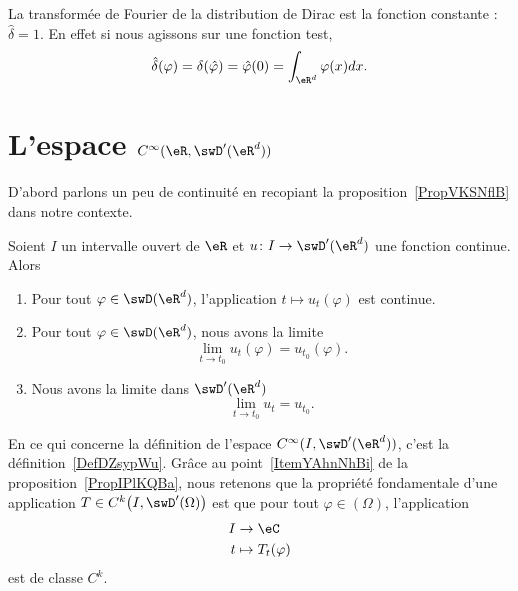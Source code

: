 \begin{example}
    La transformée de Fourier de la distribution de Dirac est la fonction constante : \( \hat \delta=1\). En effet si nous agissons sur une fonction test,
    \begin{equation}
        \hat \delta(\varphi)=\delta(\hat \varphi)=\hat \varphi(0)=\int_{\eR^d}\varphi(x)dx.
    \end{equation}
\end{example}

\section{L'espace \texorpdfstring{$  C^{\infty}(\eR,\swD'(\eR^d))$}{C(R,D')}}
\label{SecTEgDVWO}

D'abord parlons un peu de continuité en recopiant la proposition~\ref{PropVKSNflB} dans notre contexte.
\begin{proposition}     \label{PropIPlKQBa}
    Soient \( I\) un intervalle ouvert de \( \eR\) et \( u\colon I\to \swD'(\eR^d)\) une fonction continue. Alors
    \begin{enumerate}
        \item   \label{ItemYAhnNhBi}
            Pour tout \( \varphi\in\swD(\eR^d)\), l'application \( t\mapsto u_t(\varphi)\) est continue.
        \item
            Pour tout \( \varphi\in\swD(\eR^d)\), nous avons la limite
            \begin{equation}
                \lim_{t\to t_0} u_t(\varphi)=u_{t_0}(\varphi).
            \end{equation}
        \item
            Nous avons la limite dans \( \swD'(\eR^d)\)
            \begin{equation}
                \lim_{t\to t_0} u_t=u_{t_0}.
            \end{equation}
    \end{enumerate}
\end{proposition}
En ce qui concerne la définition de l'espace \( C^{\infty}(I,\swD'(\eR^d))\), c'est la définition~\ref{DefDZsypWu}. Grâce au point~\ref{ItemYAhnNhBi} de la proposition~\ref{PropIPlKQBa}, nous retenons que la propriété fondamentale d'une application \( T\in C^k\big( I,\swD'(\Omega) \big)\) est que pour tout \( \varphi\in(\Omega)\), l'application
\begin{equation}
    \begin{aligned}
         I&\to \eC \\
        t&\mapsto T_t(\varphi)
    \end{aligned}
\end{equation}
est de classe \( C^k\).

